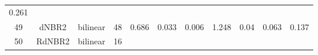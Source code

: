 \documentclass[twoside,12pt,final]{ucthesis-CA2012}
\begin{document}
\begin{ucmainmatter}
\begin{longtable}[]{@{}ccccccccccc@{}}
\begin{minipage}[t]{0.05\columnwidth}
0.261\strut
\end{minipage}\tabularnewline
\begin{minipage}[t]{0.04\columnwidth}\centering\strut
49\strut
\end{minipage} & \begin{minipage}[t]{0.11\columnwidth}\centering\strut
dNBR2\strut
\end{minipage} & \begin{minipage}[t]{0.06\columnwidth}\centering\strut
bilinear\strut
\end{minipage} & \begin{minipage}[t]{0.08\columnwidth}\centering\strut
48\strut
\end{minipage} & \begin{minipage}[t]{0.08\columnwidth}\centering\strut
0.686\strut
\end{minipage} & \begin{minipage}[t]{0.07\columnwidth}\centering\strut
0.033\strut
\end{minipage} & \begin{minipage}[t]{0.07\columnwidth}\centering\strut
0.006\strut
\end{minipage} & \begin{minipage}[t]{0.07\columnwidth}\centering\strut
1.248\strut
\end{minipage} & \begin{minipage}[t]{0.05\columnwidth}\centering\strut
0.04\strut
\end{minipage} & \begin{minipage}[t]{0.05\columnwidth}\centering\strut
0.063\strut
\end{minipage} & \begin{minipage}[t]{0.05\columnwidth}\centering\strut
0.137\strut
\end{minipage}\tabularnewline
\begin{minipage}[t]{0.04\columnwidth}\centering\strut
50\strut
\end{minipage} & \begin{minipage}[t]{0.11\columnwidth}\centering\strut
RdNBR2\strut
\end{minipage} & \begin{minipage}[t]{0.06\columnwidth}\centering\strut
bilinear\strut
\end{minipage} & \begin{minipage}[t]{0.08\columnwidth}\centering\strut
16\strut
\end{minipage} & \begin{minipage}[t]{0.08\columnwidth}\centering\strut

\end{minipage}
\end{longtable}
\end{ucmainmatter}
\end{document}
